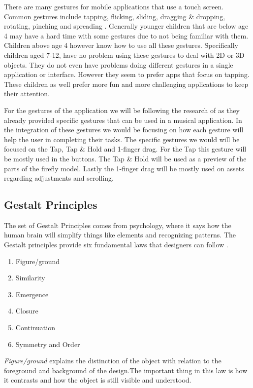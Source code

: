 There are many gestures for mobile applications that use a touch screen. Common gestures include tapping, flicking, sliding, dragging & dropping, rotating, pinching and spreading \cite{aziz2013children}. Generally younger children that are below age 4 may have a hard time with some gestures due to not being familiar with them. Children above age 4 however know how to use all these gestures. Specifically children aged 7-12, have no problem using these gestures to deal with 2D or 3D objects. They do not even have problems doing different gestures in a single application or interface. However they seem to prefer apps that focus on tapping. These children as well prefer more fun and more challenging applications to keep their attention.

For the gestures of the application we will be following the research of  as they already provided specific gestures that can be used in a musical application. In the integration of these gestures we would be focusing on how each gesture will help the user in completing their tasks. The specific gestures we would will be focused on the Tap, Tap & Hold and 1-finger drag. For the Tap this gesture will be mostly used in the buttons. The Tap & Hold will be used as a preview of the parts of the firefly model. Lastly the 1-finger drag will be mostly used on assets regarding adjustments and scrolling.

\subsection{Gestalt Principles}
The set of Gestalt Principles comes from psychology, where it says how the human brain will simplify things like elements and recognizing patterns. The Gestalt principles provide six fundamental laws that designers can follow \cite{yee2002user,chapman_2018}.

\begin{enumerate} 
\item Figure/ground
\item Similarity
\item Emergence
\item Closure
\item Continuation
\item Symmetry and Order
\end{enumerate}

\textit{Figure/ground} explains the distinction of the object with relation to the foreground and background of the design.The important thing in this law is how it contrasts and how the object is still visible and understood.

